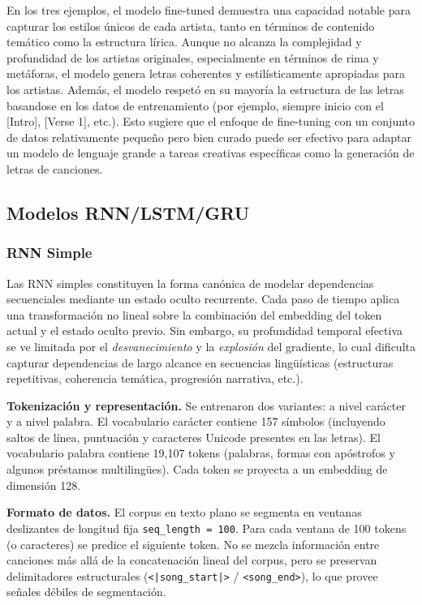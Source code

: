 \documentclass[paper=letter, fontsize=11pt, draft=false]{scrartcl}
\numberwithin{equation}{section} %
\numberwithin{figure}{section} %
\numberwithin{table}{section} %
\numberwithin{subsection}{section}
\begin{document}
En los tres ejemplos, el modelo fine-tuned demuestra una capacidad notable para capturar los estilos únicos de cada artista, tanto en términos de contenido temático como la estructura lírica. Aunque no alcanza la complejidad y profundidad de los artistas originales, especialmente en términos de rima y metáforas, el modelo genera letras coherentes y estilísticamente apropiadas para los artistas. Además, el modelo respetó en su mayoría la estructura de las letras basandose en los datos de entrenamiento (por ejemplo, siempre inicio con el [Intro], [Verse 1], etc.). Esto sugiere que el enfoque de fine-tuning con un conjunto de datos relativamente pequeño pero bien curado puede ser efectivo para adaptar un modelo de lenguaje grande a tareas creativas específicas como la generación de letras de canciones.

\newpage
\subsection{Modelos RNN/LSTM/GRU}

\subsubsection{RNN Simple}
Las RNN simples constituyen la forma canónica de modelar dependencias secuenciales mediante un estado oculto recurrente. Cada paso de tiempo aplica una transformación no lineal sobre la combinación del embedding del token actual y el estado oculto previo. Sin embargo, su profundidad temporal efectiva se ve limitada por el \emph{desvanecimiento} y la \emph{explosión} del gradiente, lo cual dificulta capturar dependencias de largo alcance en secuencias lingüísticas (estructuras repetitivas, coherencia temática, progresión narrativa, etc.).

	\textbf{Tokenización y representación.} Se entrenaron dos variantes: a nivel carácter y a nivel palabra. El vocabulario carácter contiene 157 símbolos (incluyendo saltos de línea, puntuación y caracteres Unicode presentes en las letras). El vocabulario palabra contiene 19{,}107 tokens (palabras, formas con apóstrofos y algunos préstamos multilingües). Cada token se proyecta a un embedding de dimensión 128.

	\textbf{Formato de datos.} El corpus en texto plano se segmenta en ventanas deslizantes de longitud fija \texttt{seq\_length = 100}. Para cada ventana de 100 tokens (o caracteres) se predice el siguiente token. No se mezcla información entre canciones más allá de la concatenación lineal del corpus, pero se preservan delimitadores estructurales (\texttt{<|song\_start|>} / \texttt{<song\_end>}), lo que provee señales débiles de segmentación.
\end{document}

